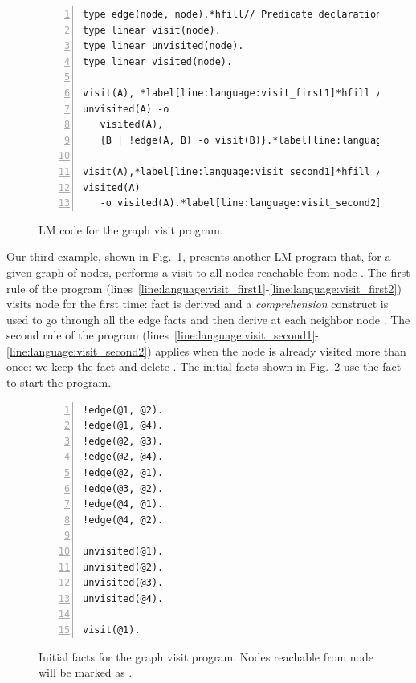 
\begin{figure}[h!]
\begin{Verbatim}[numbers=left,fontsize=\codesize,commandchars=\*\[\]]
type edge(node, node).*hfill// Predicate declaration
type linear visit(node).
type linear unvisited(node).
type linear visited(node).

visit(A), *label[line:language:visit_first1]*hfill // Rule 1: visit node
unvisited(A) -o
   visited(A),
   {B | !edge(A, B) -o visit(B)}.*label[line:language:visit_first2]*label[line:language:visit_comprehension]

visit(A),*label[line:language:visit_second1]*hfill // Rule 2: node already visited
visited(A)
   -o visited(A).*label[line:language:visit_second2]
\end{Verbatim}
  \caption{LM code for the graph visit program.}
  \label{code:language:visit}
\end{figure}

Our third example, shown in Fig.~\ref{code:language:visit}, presents another LM
program that, for a given graph of nodes, performs a visit to all nodes
reachable from node . The first rule of the program
(lines~\ref{line:language:visit_first1}-\ref{line:language:visit_first2}) visits
node  for the first time: fact  is derived and a
\emph{comprehension} construct is used to go through all the edge facts and then
derive  at each neighbor node . The second rule of the
program
(lines~\ref{line:language:visit_second1}-\ref{line:language:visit_second2})
applies when the node is already visited more than once: we keep the
 fact and delete . The initial facts shown in
Fig.~\ref{code:language:visit_initial} use the  fact to start
the program.

\begin{figure}[h!]
\begin{Verbatim}[numbers=left,fontsize=\codesize,commandchars=\*\[\]]
!edge(@1, @2).
!edge(@1, @4).
!edge(@2, @3).
!edge(@2, @4).
!edge(@2, @1).
!edge(@3, @2).
!edge(@4, @1).
!edge(@4, @2).

unvisited(@1).
unvisited(@2).
unvisited(@3).
unvisited(@4).

visit(@1).
\end{Verbatim}
  \caption{Initial facts for the graph visit program. Nodes reachable from node  will be marked as .}
  \label{code:language:visit_initial}
\end{figure}

